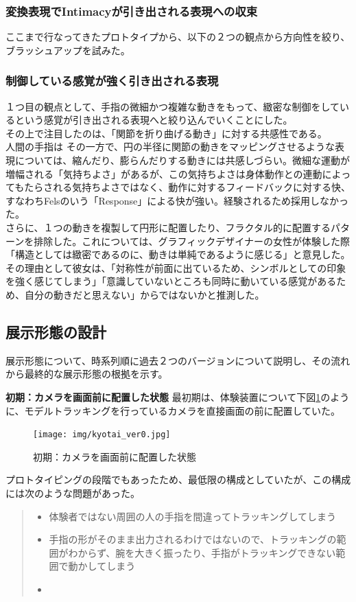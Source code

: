 \subsubsection{変換表現でIntimacyが引き出される表現への収束}
ここまで行なってきたプロトタイプから、以下の２つの観点から方向性を絞り、ブラッシュアップを試みた。
\subsubsection*{制御している感覚が強く引き出される表現}
１つ目の観点として、手指の微細かつ複雑な動きをもって、緻密な制御をしているという感覚が引き出される表現へと絞り込んでいくことにした。\\
その上で注目したのは、「関節を折り曲げる動き」に対する共感性である。\\
人間の手指は
その一方で、円の半径に関節の動きをマッピングさせるような表現については、縮んだり、膨らんだりする動きには共感しづらい。微細な運動が増幅される「気持ちよさ」があるが、この気持ちよさは身体動作との連動によってもたらされる気持ちよさではなく、動作に対するフィードバックに対する快、すなわちFelsのいう「Response」による快が強い。経験されるため採用しなかった。\\
さらに、１つの動きを複製して円形に配置したり、フラクタル的に配置するパターンを排除した。これについては、グラフィックデザイナーの女性が体験した際「構造としては緻密であるのに、動きは単純であるように感じる」と意見した。その理由として彼女は、「対称性が前面に出ているため、シンボルとしての印象を強く感じてしまう」「意識していないところも同時に動いている感覚があるため、自分の動きだと思えない」からではないかと推測した。

\subsection{展示形態の設計}
展示形態について、時系列順に過去２つのバージョンについて説明し、その流れから最終的な展示形態の根拠を示す。

\textbf{初期：カメラを画面前に配置した状態}
最初期は、体験装置について下図\ref{fig:kyotai_ver0}のように、モデルトラッキングを行っているカメラを直接画面の前に配置していた。
\begin{figure}[H]
  \centering
  \texttt{[image: img/kyotai\_ver0.jpg]}
  \caption{初期：カメラを画面前に配置した状態}
  \label{fig:kyotai_ver0}
\end{figure}

プロトタイピングの段階でもあったため、最低限の構成としていたが、この構成には次のような問題があった。
\begin{quote}
  \begin{itemize}
    \item 体験者ではない周囲の人の手指を間違ってトラッキングしてしまう
    \item 手指の形がそのまま出力されるわけではないので、トラッキングの範囲がわからず、腕を大きく振ったり、手指がトラッキングできない範囲で動かしてしまう
    \item 
  \end{itemize}
\end{quote}



